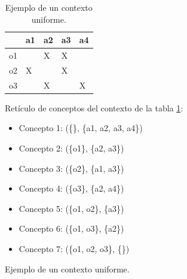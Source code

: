 \documentclass[oneside,openright,titlepage,numbers=noenddot,openany,headinclude,footinclude=true,
cleardoublepage=empty,abstractoff,BCOR=5mm,paper=a4,fontsize=12pt,main=spanish]{scrreprt}
\begin{document}
\begin{figure}[H]
\centering
\begin{minipage}{.4\textwidth}
  \centering
    \begin{table}[H]
    \begin{tabular}{|l|l|l|l|l|}
    \hline
       & a1 & a2 & a3 & a4 \\ \hline
    o1 & ~  & X  & X  & ~  \\ \hline
    o2 & X  & ~  & X  & ~  \\ \hline
    o3 & ~  & X  & ~  & X  \\ \hline
    \end{tabular}
    \caption{Ejemplo de un contexto uniforme.}
    \label{tab:uniforme}
    \end{table}
\end{minipage}%
\begin{minipage}{.6\textwidth}
  \centering
Retículo de conceptos del contexto de la tabla \ref{tab:uniforme}:\\
\begin{itemize}
    \item Concepto 1: (\{\}, \{a1, a2, a3, a4\}) 
    \item Concepto 2: (\{o1\}, \{a2, a3\}) 
    \item Concepto 3: (\{o2\}, \{a1, a3\}) 
    \item Concepto 4: (\{o3\}, \{a2, a4\}) 
    \item Concepto 5: (\{o1, o2\}, \{a3\}) 
    \item Concepto 6: (\{o1, o3\}, \{a2\}) 
    \item Concepto 7: (\{o1, o2, o3\}, \{\}) 
\end{itemize}
\end{minipage}
\end{figure}
\end{document}
